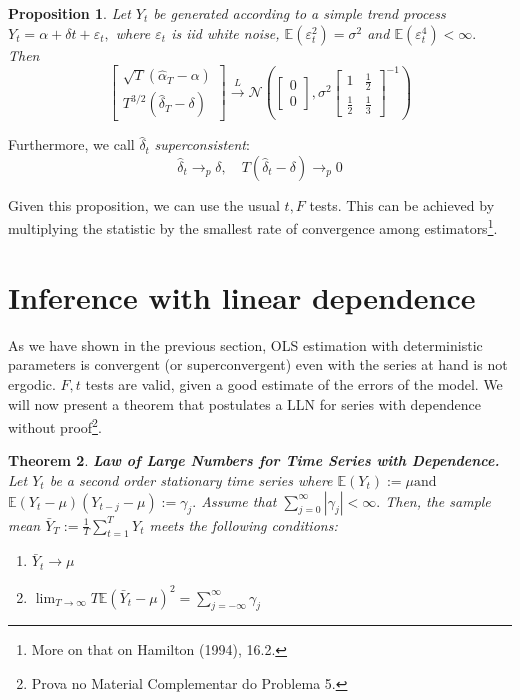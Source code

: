 \documentclass[11pt, a4paper]{report}
\theoremstyle{plain}
\newtheorem{thm}{Theorem}[section]
\newtheorem{prop}[thm]{Proposition}
\theoremstyle{plain}
\theoremstyle{remark}
\begin{document}
\begin{prop}
Let $Y_{t}$ be generated according to a simple trend process $Y_{t}=\alpha+\delta t+\varepsilon_{t},$ where $\varepsilon_{t}$ is \textit{iid} white noise, $\mathbb{E}\left(\varepsilon_{t}^{2}\right)=\sigma^{2}$ and $\mathbb{E}\left(\varepsilon_{t}^{4}\right)<\infty .$ Then
$$
\left[\begin{array}{c}
\sqrt{T}\left(\hat{\alpha}_{T}-\alpha\right) \\
T^{3 / 2}\left(\hat{\delta}_{T}-\delta\right)
\end{array}\right] \stackrel{L}{\rightarrow} \mathcal{N}\left(\left[\begin{array}{c}
0 \\
0
\end{array}\right], \sigma^{2}\left[\begin{array}{cc}
1 & \frac{1}{2} \\
\frac{1}{2} & \frac{1}{3}
\end{array}\right]^{-1}\right)
$$
\end{prop}

Furthermore, we call $\hat{\delta}_t$ \textit{superconsistent}: 
$$ \hat{\delta}_t \to_p \delta, \hspace{1em} T(\hat{\delta}_t - \delta) \to_p 0 $$

Given this proposition, we can use the usual $t, F$ tests. This can be achieved by multiplying the statistic by the smallest rate of convergence among estimators\footnote{More on that on Hamilton (1994), 16.2.}.


\section{Inference with linear dependence} %

As we have shown in the previous section, OLS estimation with deterministic parameters is convergent (or superconvergent) even with the series at hand is not ergodic. $F, t$ tests are valid, given a good estimate of the errors of the model. We will now present a theorem that postulates a LLN for series with dependence without proof\footnote{Prova no Material Complementar do Problema 5.}.

\begin{thm}{\textbf{Law of Large Numbers for Time Series with Dependence.}}
Let $Y_{t}$ be a second order stationary time series where  $\mathbb{E}\left(Y_{t}\right):=\mu \mathrm{and}$ $\mathbb{E}\left(Y_{t}-\mu\right)\left(Y_{t-j}-\mu\right):=\gamma_{j} .$ Assume that $\sum_{j=0}^{\infty}\left|\gamma_{j}\right|<\infty .$ Then, the sample mean $\bar{Y}_{T}:=\frac{1}{T} \sum_{t=1}^{T} Y_{t}$ meets the following conditions:
\begin{enumerate}
\item $\bar{Y}_{t} \rightarrow \mu$
\item $\lim _{T \rightarrow \infty} T\mathbb{E}\left(\bar{Y}_{t}-\mu\right)^{2}=\sum_{j=-\infty}^{\infty} \gamma_{j}$
\end{enumerate}
\end{thm}
\end{document}
